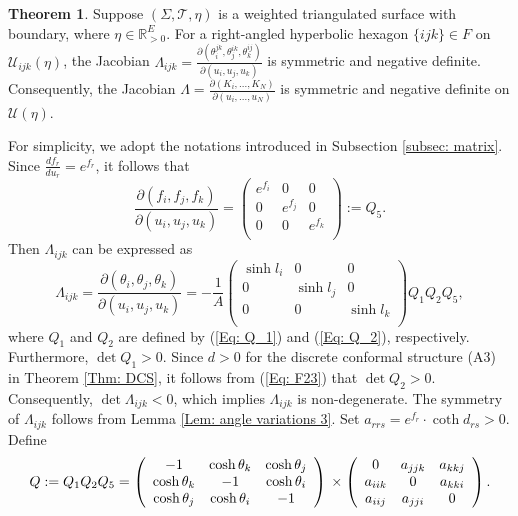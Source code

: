 \documentclass[12pt]{amsart}
\theoremstyle{definition}
\newtheorem{theorem}{Theorem}[section]
\begin{document}
\begin{theorem}\label{Thm: matrix negative 2}
Suppose $(\Sigma,\mathcal{T},\eta)$ is a weighted triangulated surface with boundary, where $\eta\in \mathbb{R}_{>0}^E$.
For a right-angled hyperbolic hexagon $\{ijk\}\in F$ on $\mathcal{U}_{ijk}(\eta)$,
the Jacobian $\Lambda_{ijk}=\frac{\partial(\theta^{jk}_i,\theta^{ik}_j,\theta^{ij}_k)}
{\partial(u_i,u_j,u_k)}$ is symmetric and negative definite.
Consequently, the Jacobian $\Lambda=\frac{\partial (K_i,..., K_N)}{\partial(u_i,...,u_N)}$ is symmetric and negative definite on $\mathcal{U}(\eta)$.
\end{theorem}
\proof
For simplicity, we adopt the notations introduced in Subsection \ref{subsec: matrix}.
Since $\frac{d f_r}{d u_r}=e^{f_r}$, it follows that
\begin{equation*}
\frac{\partial(f_i,f_j,f_k)}
{\partial(u_i,u_j,u_k)}
=\left(
   \begin{array}{ccc}
     e^{f_i} & 0 & 0 \\
     0 & e^{f_j} & 0 \\
     0 & 0 & e^{f_k} \\
   \end{array}
 \right)
 :=Q_5.
\end{equation*}
Then $\Lambda_{ijk}$ can be expressed as
\begin{equation*}
\Lambda_{ijk}=
\frac{\partial(\theta_i,\theta_j,\theta_k)}
{\partial(u_i,u_j,u_k)}
=-\frac{1}{A}
 \left(
   \begin{array}{ccc}
     \sinh l_i & 0 & 0 \\
     0 & \sinh l_j & 0 \\
     0 & 0 & \sinh l_k \\
   \end{array}
 \right)Q_1Q_2Q_5,
\end{equation*}
where $Q_1$ and $Q_2$ are defined by (\ref{Eq: Q_1}) and (\ref{Eq: Q_2}), respectively. 
Furthermore, $\det Q_1>0$.
Since $d>0$ for the discrete conformal structure (A3) in Theorem \ref{Thm: DCS},
it follows from (\ref{Eq: F23}) that $\det Q_2>0$.
Consequently, $\det\Lambda_{ijk}<0$,
which implies $\Lambda_{ijk}$ is non-degenerate.
The symmetry of $\Lambda_{ijk}$ follows from Lemma \ref{Lem: angle variations 3}.
Set $a_{rrs}=e^{f_r}\cdot\coth d_{rs}>0$.
Define
\begin{equation*}
Q:=Q_1Q_2Q_5=\left(
   \begin{array}{ccc}
     -1 & \cosh\theta_k & \cosh\theta_j \\
     \cosh\theta_k & -1 & \cosh\theta_i \\
     \cosh\theta_j & \cosh\theta_i & -1 \\
   \end{array}
 \right)\\
 \times
  \left(
   \begin{array}{ccc}
     0 & a_{jjk} & a_{kkj} \\
     a_{iik} & 0 & a_{kki} \\
     a_{iij} & a_{jji} & 0 \\
   \end{array}
   \right).
\end{equation*}
\end{document}
